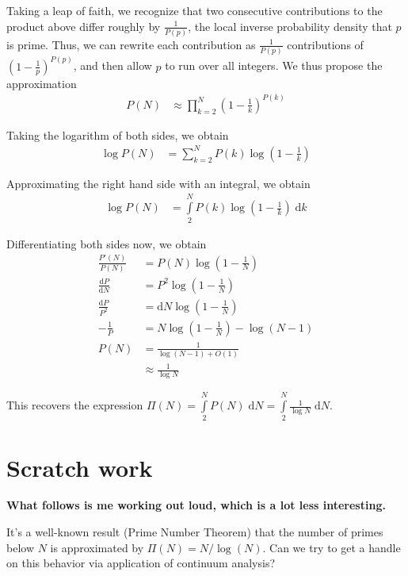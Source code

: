 \documentclass[12pt]{report}
\newcommand{\rd}[2]{\frac{\mathrm{d}#1}{\mathrm{d}#2}}
\begin{document}
Taking a leap of faith, we recognize that two consecutive contributions to the
product above differ roughly by $\frac{1}{P(p)}$, the local inverse probability
density that $p$ is prime. Thus, we can rewrite each contribution as
$\frac{1}{P(p)}$ contributions of $\left( 1 - \frac{1}{p} \right)^{P(p)}$, and
then allow $p$ to run over all integers. We thus propose the approximation
\begin{align}
    P(N) &\approx \prod_{k=2}^N\left( 1 - \frac{1}{k} \right)^{P(k)}
\end{align}

Taking the logarithm of both sides, we obtain
\begin{align}
    \log P(N) &= \sum\limits_{k=2}^{N}P(k)\log\left( 1 - \frac{1}{k} \right)
\end{align}

Approximating the right hand side with an integral, we obtain
\begin{align}
    \log P(N) &= \int\limits_{2}^{N}P(k)\log\left( 1 - \frac{1}{k}
    \right)\;\mathrm{d}k
\end{align}

Differentiating both sides now, we obtain
\begin{align}
    \frac{P'(N)}{P(N)} &= P(N)\log\left( 1 - \frac{1}{N} \right)\\
    \rd{P}{N} &= P^2\log\left( 1 - \frac{1}{N} \right)\\
    \frac{\mathrm{d}P}{P^2} &= \mathrm{d}N \log\left( 1 - \frac{1}{N} \right)\\
    -\frac{1}{P} &= N\log\left( 1 - \frac{1}{N} \right) - \log(N - 1)\\
    P(N) &= \frac{1}{\log(N - 1) + O(1)}\\
    &\approx \frac{1}{\log N}
\end{align}

This recovers the expression $\Pi(N) = \int\limits_{2}^{N}P(N)\;\mathrm{d}N =
\int\limits_{2}^{N}\frac{1}{\log N}\;\mathrm{d}N$.

\section{Scratch work}

\textbf{What follows is me working out loud, which is a lot less interesting.}

It's a well-known result (Prime Number Theorem) that the number of primes below
$N$ is approximated by $\Pi(N) = N/\log(N)$. Can we try to get a handle on this
behavior via application of continuum analysis?
\end{document}
